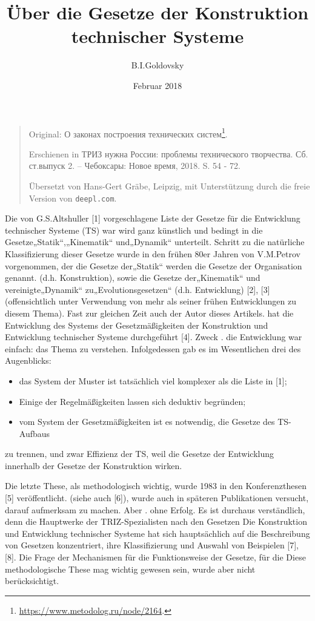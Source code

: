 \documentclass[11pt,a4paper]{article}
\title{Über die Gesetze der Konstruktion technischer Systeme }
\author{B.I.Goldovsky}
\date{Februar 2018}
\begin{document}
\maketitle
\begin{quote}
  Original: \foreignlanguage{russian}{О законах построения технических
    систем}\footnote{\url{https://www.metodolog.ru/node/2164}.}.

  Erschienen in \foreignlanguage{russian}{ТРИЗ нужна России: проблемы
    технического творчества. Сб. ст.выпуск 2. – Чебоксары: Новое время, 2018.}
  S. 54 - 72.
  
  Übersetzt von Hans-Gert Gräbe, Leipzig, mit Unterstützung durch die freie
  Version von \texttt{deepl.com}.
\end{quote}

Die von G.S.Altshuller [1] vorgeschlagene Liste der Gesetze für die
Entwicklung technischer Systeme (TS) war wird ganz künstlich und bedingt in
die Gesetze„Statik“,„Kinematik“ und„Dynamik“ unterteilt. Schritt zu die
natürliche Klassifizierung dieser Gesetze wurde in den frühen 80er Jahren von
V.M.Petrov vorgenommen, der die Gesetze der„Statik“ werden die Gesetze der
Organisation genannt. (d.h. Konstruktion), sowie die Gesetze der„Kinematik“
und vereinigte„Dynamik“ zu„Evolutionsgesetzen“ (d.h. Entwicklung) [2], [3]
(offensichtlich unter Verwendung von mehr als seiner frühen Entwicklungen zu
diesem Thema). Fast zur gleichen Zeit auch der Autor dieses Artikels.  hat die
Entwicklung des Systems der Gesetzmäßigkeiten der Konstruktion und Entwicklung
technischer Systeme durchgeführt [4]. Zweck .  die Entwicklung war einfach:
das Thema zu verstehen. Infolgedessen gab es im Wesentlichen drei des
Augenblicks:
\begin{itemize}
\item das System der Muster ist tatsächlich viel komplexer als die Liste in
  [1];
\item Einige der Regelmäßigkeiten lassen sich deduktiv begründen;
\item vom System der Gesetzmäßigkeiten ist es notwendig, die Gesetze des
  TS-Aufbaus
\end{itemize}
zu trennen, und zwar Effizienz der TS, weil die Gesetze der Entwicklung
innerhalb der Gesetze der Konstruktion wirken.

Die letzte These, als methodologisch wichtig, wurde 1983 in den
Konferenzthesen [5] veröffentlicht.  (siehe auch [6]), wurde auch in späteren
Publikationen versucht, darauf aufmerksam zu machen. Aber .  ohne Erfolg. Es
ist durchaus verständlich, denn die Hauptwerke der TRIZ-Spezialisten nach den
Gesetzen Die Konstruktion und Entwicklung technischer Systeme hat sich
hauptsächlich auf die Beschreibung von Gesetzen konzentriert, ihre
Klassifizierung und Auswahl von Beispielen [7], [8]. Die Frage der Mechanismen
für die Funktionsweise der Gesetze, für die Diese methodologische These mag
wichtig gewesen sein, wurde aber nicht berücksichtigt.
\end{document}
